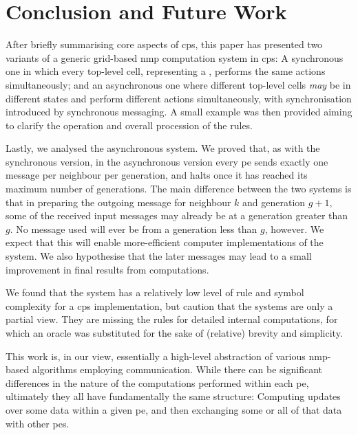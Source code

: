 \section{Conclusion and Future Work}
After briefly summarising core aspects of \gls{cps}, this paper has presented two variants of a generic grid-based \gls{nmp} computation system in \gls{cps}:  A synchronous one in which every top-level cell, representing a , performs the same actions simultaneously;  and an asynchronous one where different top-level cells \emph{may} be in different states and perform different actions simultaneously, with synchronisation introduced by synchronous messaging.  A small example was then provided aiming to clarify the operation and overall procession of the rules.

Lastly, we analysed the asynchronous system.  We proved that, as with the synchronous version, in the asynchronous version every \gls{pe} sends exactly one message per neighbour per generation, and halts once it has reached its maximum number of generations.  The main difference between the two systems is that in preparing the outgoing message for neighbour \(k\) and generation \(g + 1\), some of the received input messages may already be at a generation greater than \(g\).  No message used will ever be from a generation less than \(g\), however.  We expect that this will enable more-efficient computer implementations of the system.  We also hypothesise that the later messages may lead to a small improvement in final results from computations.

We found that the system has a relatively low level of rule and symbol complexity for a \gls{cps} implementation, but caution that the systems are only a partial view.  They are missing the rules for detailed internal computations, for which an oracle was substituted for the sake of (relative) brevity and simplicity.

This work is, in our view, essentially a high-level abstraction of various \gls{nmp}-based algorithms employing communication.  While there can be significant differences in the nature of the computations performed within each \gls{pe}, ultimately they all have fundamentally the same structure:  Computing updates over some data within a given \gls{pe}, and then exchanging some or all of that data with other \glspl{pe}.


